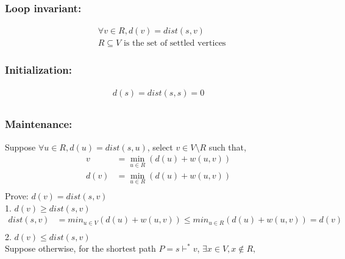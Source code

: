 \documentclass{article}
\begin{document}
\subsubsection*{Loop invariant: }
\begin{align*}
    &\forall v \in R, d(v) = dist(s, v)\\
    & R \subseteq V \text{ is the set of settled vertices}
\end{align*}
\subsubsection*{Initialization:}
\begin{align*}
    d(s) = dist(s, s) = 0\\
\end{align*}
\subsubsection*{Maintenance:}
Suppose $\forall u \in R, d(u) = dist(s, u)$, select $v \in V \setminus R$ such that, 
\begin{align*}
    v &= \min_{u \in R} (d(u) + w(u, v))\\
    d(v) &= \min_{u \in R}(d(u) + w(u,v))\\
\end{align*}
Prove: $d(v) = dist(s, v)$ \\
1. $d(v) \geq dist(s,v)$
\begin{align*}
    dist(s, v) &= min_{u \in V}(d(u) + w(u,v)) \leq min_{u \in R}(d(u) + w(u,v))= d(v)\\
\end{align*} 
2. $d(v) \leq dist(s,v)$\\
Suppose otherwise, for the shortest path $P = s \vdash ^* v$, $\exists x \in V, x\notin R, $
\end{document}
